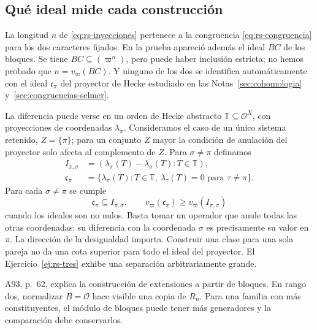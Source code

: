 \subsection{Qué ideal mide cada construcción}

La longitud $n$ de \eqref{eq:rs-inyecciones} pertenece a la
congruencia \eqref{eq:rs-congruencia} para los dos caracteres
fijados. En la prueba apareció además el ideal $BC$ de los
bloques. Se tiene $BC\subseteq(\varpi^n)$, pero puede haber
inclusión estricta; no hemos probado que $n=v_\varpi(BC)$.
Y ninguno de los dos se identifica automáticamente con el
ideal $\mathfrak c_\pi$ del proyector de Hecke estudiado en
las Notas~\ref{sec:cohomologia} y~\ref{sec:congruencias-selmer}.

La diferencia puede verse en un orden de Hecke abstracto
$\mathbb T\subseteq\mathcal O^X$, con proyecciones de coordenadas
$\lambda_\pi$. Consideramos el caso de un único sistema retenido,
$Z=\{\pi\}$; para un conjunto $Z$ mayor la condición de
anulación del proyector solo afecta al complemento de $Z$.
Para $\sigma\ne\pi$ definamos
\begin{equation}
 \begin{split}
 I_{\pi,\sigma}
  &=(\lambda_\pi(T)-\lambda_\sigma(T):T\in\mathbb T),\\
 \mathfrak c_\pi
  &=\{\lambda_\pi(T):T\in\mathbb T,
                      \ \lambda_\tau(T)=0\text{ para }\tau\ne\pi\}.
 \end{split}
 \label{eq:rs-ideales-hecke}
\end{equation}
Para cada $\sigma\ne\pi$ se cumple
\begin{equation}
 \mathfrak c_\pi\subseteq I_{\pi,\sigma},
 \qquad v_\varpi(\mathfrak c_\pi)\ge v_\varpi(I_{\pi,\sigma})
 \label{eq:rs-direccion-ideal}
\end{equation}
cuando los ideales son no nulos. Basta tomar un operador que
anule todas las otras coordenadas: su diferencia con la
coordenada $\sigma$ es precisamente su valor en $\pi$.
La dirección de la desigualdad importa. Construir una clase
para una sola pareja no da una cota superior para todo el
ideal del proyector. El Ejercicio~\ref{ej:rs-tres} exhibe una
separación arbitrariamente grande.

A93, p.~62, explica la construcción de extensiones a partir de
bloques. En rango dos,
normalizar $B=\mathcal O$ hace visible una copia de $R_n$.
Para una familia con más constituyentes, el módulo de bloques
puede tener más generadores y la comparación debe conservarlos.

